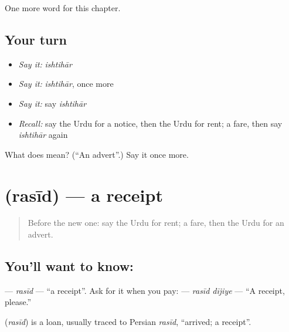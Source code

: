 \begin{grammarlens}[title={What you've built}]
One more word for this chapter.
\end{grammarlens}

\subsection*{Your turn}
\begin{itemize}
\raggedright
  \item \emph{Say it:} \emph{ishtihār}
  \item \emph{Say it:} \emph{ishtihār}, once more
  \item \emph{Say it:} say \emph{ishtihār}
  \item \emph{Recall:} say the Urdu for a notice, then the Urdu for rent; a fare, then say \emph{ishtihār} again
\end{itemize}

\begin{tcolorbox}[breakable,colback=teal!4,colframe=teal!35!black,title={Before you move on}]
What does  mean? (\textquotedblleft{}An advert\textquotedblright{}.) Say it once more.
\end{tcolorbox}
\section[\texorpdfstring{\ur{رسید} (rasīd)}{رسید (rasīd)}]{ (rasīd) — a receipt}

\label{lesson:UR-C146-rasid}



\begin{quote}
Before the new one: say the Urdu for rent; a fare, then the Urdu for an advert.
\end{quote}

\subsection*{You'll want to know: }
\textbf{} — \emph{rasīd} — \textquotedblleft{}a receipt\textquotedblright{}. Ask for it when you pay: \textbf{ } — \emph{rasīd dījiye} — \textquotedblleft{}A receipt, please.\textquotedblright{}

\begin{cousinweb}
\textbf{} (\emph{rasīd}) is a loan, usually traced to Persian \emph{rasīd}, \textquotedblleft{}arrived; a receipt\textquotedblright{}.
\end{cousinweb}

